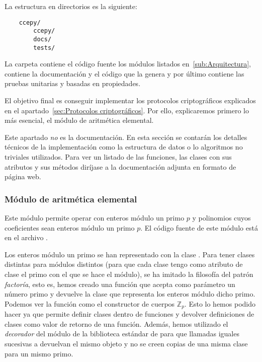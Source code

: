 La estructura en directorios es la siguiente:
\begin{verbatim}
    ccepy/
        ccepy/
        docs/
        tests/
\end{verbatim}
La carpeta  contiene el código fuente los módulos listados en~\ref{sub:Arquitectura},  contiene la documentación y el código que la genera y por último  contiene las pruebas unitarias y basadas en propiedades.

El objetivo final es conseguir implementar los protocolos criptográficos explicados en el apartado~\ref{sec:Protocolos criptográficos}. Por ello, explicaremos primero lo más esencial, el módulo de aritmética elemental.

\begin{nota}
    Este apartado \emph{no} es la documentación. En esta sección se contarán los detalles técnicos de la implementación como la estructura de datos o lo algoritmos no triviales utilizados. Para ver un listado de las funciones, las clases con sus atributos y sus métodos diríjase a la documentación adjunta en formato de página web.
\end{nota}

\subsubsection{Módulo de aritmética elemental}
\label{subs:Módulo de aritmética elemental}

Este módulo permite operar con enteros módulo un primo $p$ y polinomios
cuyos coeficientes sean enteros módulo un primo $p$. El código fuente de este módulo está en el archivo .

Los enteros módulo un primo se han representado con la clase . Para tener clases distintas para módulos distintos (para que cada clase tengo como atributo de clase el primo con el que se hace el módulo), se ha imitado la filosofía del patrón \emph{factoría}, esto es, hemos creado una función  que acepta como parámetro un número primo y devuelve la clase que representa los enteros módulo dicho primo. Podemos ver la función  como el constructor de cuerpos $\mathbb{Z}_p$. Esto lo hemos podido hacer ya que  permite definir clases dentro de funciones y devolver definiciones de clases como valor de retorno de una función. Además, hemos utilizado el \emph{decorador}  del módulo  de la biblioteca estándar de  para que llamadas iguales sucesivas a  devuelvan el mismo objeto y no se creen copias de una misma clase para un mismo primo.


